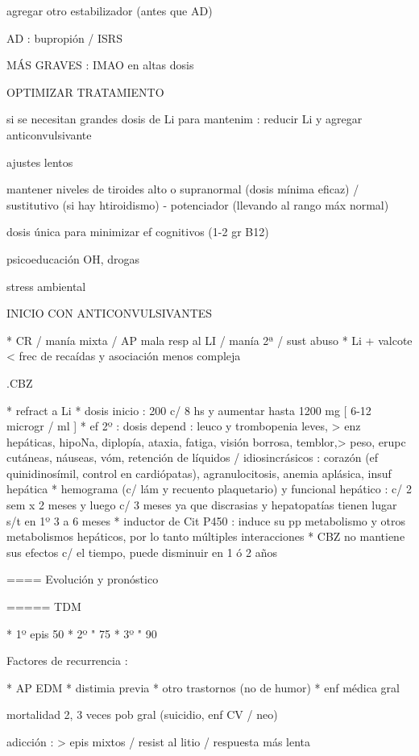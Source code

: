 agregar otro estabilizador (antes que AD)

AD : bupropión / ISRS

MÁS GRAVES : IMAO en altas dosis

OPTIMIZAR TRATAMIENTO

si se necesitan grandes dosis de Li para mantenim : reducir Li y agregar anticonvulsivante

ajustes lentos

mantener niveles de tiroides alto o supranormal (dosis mínima eficaz) / sustitutivo (si hay htiroidismo) - potenciador (llevando al rango máx normal)

dosis única para minimizar ef cognitivos (1-2 gr B12)

psicoeducación OH, drogas

stress ambiental

INICIO CON ANTICONVULSIVANTES

* CR / manía mixta / AP mala resp al LI / manía 2ª / sust abuso
* Li + valcote < frec de recaídas y asociación menos compleja

.CBZ

* refract a Li
* dosis inicio : 200 c/ 8 hs y aumentar hasta 1200 mg [ 6-12 microgr / ml ]
* ef 2º : dosis depend : leuco y trombopenia leves, > enz hepáticas, hipoNa, diplopía, ataxia, fatiga, visión borrosa, temblor,> peso, erupc cutáneas, náuseas, vóm, retención de líquidos / idiosincrásicos : corazón (ef quinidinosímil, control en cardiópatas), agranulocitosis, anemia aplásica, insuf hepática
* hemograma (c/ lám y recuento plaquetario) y funcional hepático : c/ 2 sem x 2 meses y luego c/ 3 meses ya que discrasias y hepatopatías tienen lugar s/t en 1º 3 a 6 meses
* inductor de Cit P450 : induce su pp metabolismo y otros metabolismos hepáticos, por lo tanto múltiples interacciones
* CBZ no mantiene sus efectos c/ el tiempo, puede disminuir en 1 ó 2 años

==== Evolución y pronóstico

===== TDM

* 1º epis 50%
* 2º " 75%
* 3º " 90 %

Factores de recurrencia :

* AP EDM
* distimia previa
* otro trastornos (no de humor)
* enf médica gral

mortalidad 2, 3 veces pob gral (suicidio, enf CV / neo)

adicción : > epis mixtos / resist al litio / respuesta más lenta

